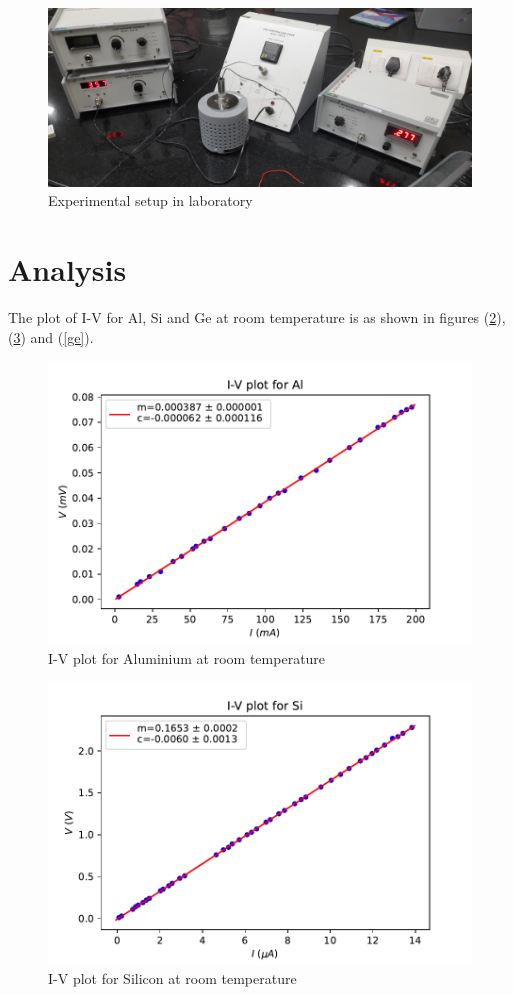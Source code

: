 \documentclass[a4paper, amsfonts, amssymb, amsmath, reprint, showkeys, nofootinbib, twoside]{revtex4-1}
\begin{document}
\begin{figure}[H]
	\centering
	\includegraphics[scale=0.06]{setup}
	\caption{Experimental setup in laboratory}
	\label{s}
\end{figure}

\section{Analysis}
The plot of I-V for Al, Si and Ge at room temperature is as shown in figures (\ref{al}), (\ref{si}) and (\ref{ge}).

\begin{figure}[H]
	\centering
	\includegraphics[scale=0.5]{al}
	\caption{I-V plot for Aluminium at room temperature}
	\label{al}
\end{figure}

\begin{figure}[H]
	\centering
	\includegraphics[scale=0.5]{si}
	\caption{I-V plot for Silicon at room temperature}
	\label{si}
\end{figure}
\end{document}
